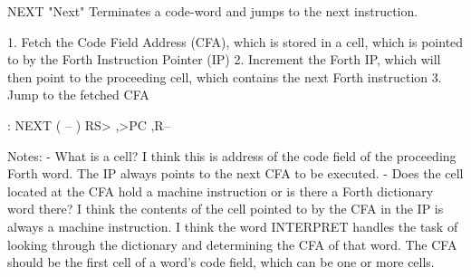 \documentclass[
    letterpaper, %
	fontsize=10pt, %
	twoside=true, %
	numbers=noenddot, %
]{kaobook}
\begin{document}
NEXT  "Next"
Terminates a code-word and jumps to the next instruction.

1. Fetch the Code Field Address (CFA),
   which is stored in a cell,
   which is pointed to by the Forth Instruction Pointer (IP)
2. Increment the Forth IP,
   which will then point to the proceeding cell,
   which contains the next Forth instruction
3. Jump to the fetched CFA

    : NEXT ( -- )
        RS> ,>PC ,R--


Notes:
   - What is a cell? I think this is address of the code field of the
   proceeding Forth word. The IP always points to the next CFA to be
   executed.
   - Does the cell located at the CFA hold a machine instruction or
   is there a Forth dictionary word there? I think the contents of the
   cell pointed to by the CFA in the IP is always a machine instruction.
   I think the word INTERPRET handles the task of looking through the
   dictionary and determining the CFA of that word. The CFA should be
   the first cell of a word's code field, which can be one or more cells.
























%

\end{document}
